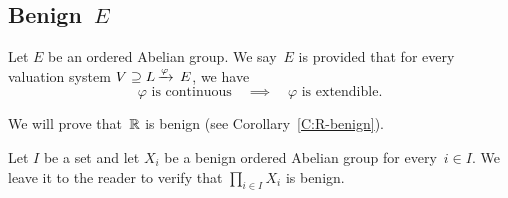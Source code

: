 \subsection{Benign~$E$}
\begin{dfn}
\label{D:benign}
Let $E$ be an ordered Abelian group.
We say~$E$ is  provided 
that for every valuation system
$V \supseteq L\,\smash{\xrightarrow{\varphi}\,E}$,
we have
\begin{equation*}
\varphi\text{ is continuous}
\quad\implies\quad
\varphi\text{ is extendible}.
\end{equation*}
\end{dfn}
\begin{ex}
We will prove that~$\mathbb{R}$ is benign (see Corollary~\ref{C:R-benign}).
\end{ex}
\begin{ex}
Let $I$ be a set
and let $X_i$ be a benign ordered Abelian group
for every~$i\in I$.
We leave it to the reader to verify
that $\prod_{i \in I} X_i$ is benign.
\end{ex}


